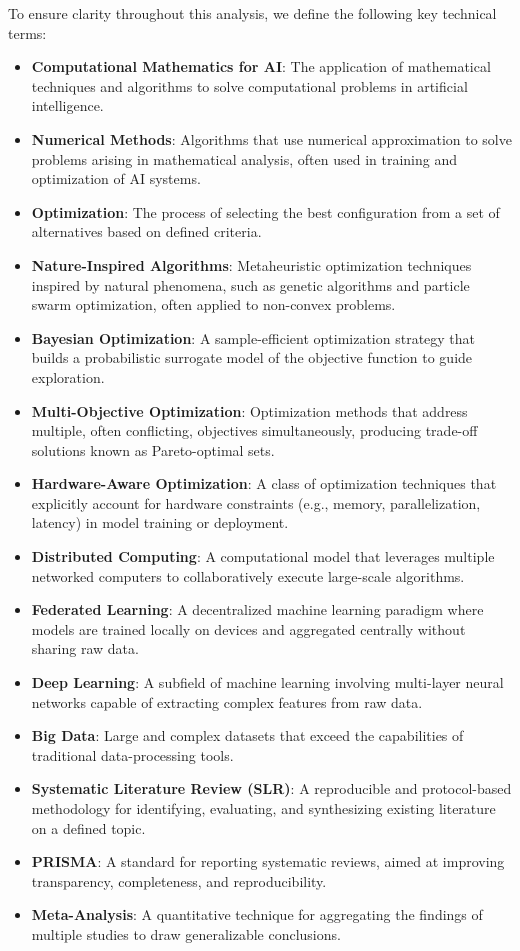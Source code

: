 \documentclass[acmsmall]{acmart}
\begin{document}
To ensure clarity throughout this analysis, we define the following key technical terms:
\begin{itemize}
    \item \textbf{Computational Mathematics for AI}: The application of mathematical techniques and algorithms to solve computational problems in artificial intelligence.
    \item \textbf{Numerical Methods}: Algorithms that use numerical approximation to solve problems arising in mathematical analysis, often used in training and optimization of AI systems.
    \item \textbf{Optimization}: The process of selecting the best configuration from a set of alternatives based on defined criteria.
    \item \textbf{Nature-Inspired Algorithms}: Metaheuristic optimization techniques inspired by natural phenomena, such as genetic algorithms and particle swarm optimization, often applied to non-convex problems.
    \item \textbf{Bayesian Optimization}: A sample-efficient optimization strategy that builds a probabilistic surrogate model of the objective function to guide exploration.
    \item \textbf{Multi-Objective Optimization}: Optimization methods that address multiple, often conflicting, objectives simultaneously, producing trade-off solutions known as Pareto-optimal sets.
    \item \textbf{Hardware-Aware Optimization}: A class of optimization techniques that explicitly account for hardware constraints (e.g., memory, parallelization, latency) in model training or deployment.
    \item \textbf{Distributed Computing}: A computational model that leverages multiple networked computers to collaboratively execute large-scale algorithms.
    \item \textbf{Federated Learning}: A decentralized machine learning paradigm where models are trained locally on devices and aggregated centrally without sharing raw data.
    \item \textbf{Deep Learning}: A subfield of machine learning involving multi-layer neural networks capable of extracting complex features from raw data.
    \item \textbf{Big Data}: Large and complex datasets that exceed the capabilities of traditional data-processing tools.
    \item \textbf{Systematic Literature Review (SLR)}: A reproducible and protocol-based methodology for identifying, evaluating, and synthesizing existing literature on a defined topic.
    \item \textbf{PRISMA}: A standard for reporting systematic reviews, aimed at improving transparency, completeness, and reproducibility.
    \item \textbf{Meta-Analysis}: A quantitative technique for aggregating the findings of multiple studies to draw generalizable conclusions.
\end{itemize}
\end{document}
